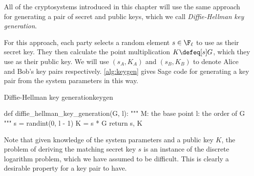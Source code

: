 All of the cryptosystems introduced in this chapter will use the same approach for generating a pair of secret and public keys, which we call \emph{Diffie-Hellman key generation}.

For this approach, each party selects a random element $s \in \F_\ell$ to use as their secret key. They then calculate the point multiplication $K \defeq [s] G$, which they use as their public key. We will use $(s_A, K_A)$ and $(s_B, K_B)$ to denote Alice and Bob's key pairs respectively. \cref{alg:keygen} gives Sage code for generating a key pair from the system parameters in this way.

\begin{alg}{Diffie-Hellman key generation}{keygen}
\begin{sagecode}
def diffie_hellman_key_generation(G, l):
    """
    M: the base point
    l: the order of G
    """
    s = randint(0, l - 1)
    K = s * G
    return s, K
\end{sagecode}
\end{alg}

Note that given knowledge of the system parameters and a public key $K$, the problem of deriving the matching secret key $s$ is an instance of the discrete logarithm problem, which we have assumed to be difficult. This is clearly a desirable property for a key pair to have.
